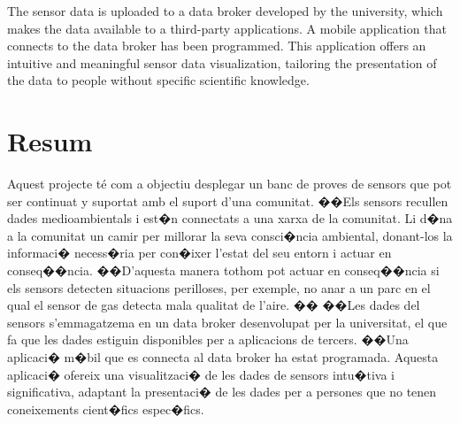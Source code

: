 \documentclass[12pt, a4paper,twoside]{tesi_upf}
\begin{document}
  The sensor data is uploaded to a data broker developed by the university, which makes the data available to a third-party applications. 
  A mobile application that connects to the data broker has been programmed. 
  This application offers an intuitive and meaningful sensor data visualization, tailoring the presentation of the data to people without specific scientific knowledge.


\section*{\Large \sffamily  Resum}

	Aquest projecte té com a objectiu desplegar un banc de proves de sensors que pot ser continuat y suportat amb el suport d'una comunitat. 
��Els sensors recullen dades medioambientals i est�n connectats a una xarxa de la comunitat. Li d�na a la comunitat un camir per millorar la seva consci�ncia ambiental, donant-los la informaci� necess�ria per con�ixer l'estat del seu entorn i actuar en conseq��ncia. 
��D'aquesta manera tothom pot actuar en conseq��ncia si els sensors detecten situacions perilloses, per exemple, no anar a un parc en el qual el sensor de gas detecta mala qualitat de l'aire. 
��
��Les dades del sensors s'emmagatzema en un data broker desenvolupat per la universitat, el que fa que les dades estiguin disponibles per a aplicacions de tercers. 
��Una aplicaci� m�bil que es connecta al data broker ha estat programada. 
	Aquesta aplicaci� ofereix una visualitzaci� de les dades de sensors intu�tiva i significativa, adaptant la presentaci� de les dades per a persones que no tenen coneixements cient�fics espec�fics.


\cleardoublepage

%


\tableofcontents

\listoffigures

\listoftables
\end{document}
